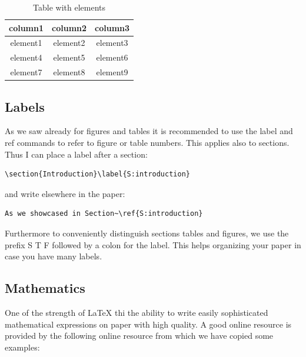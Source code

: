 \begin{table}[htb]
\caption{Table with elements}\label{T:elements}
\bigskip
\begin{center}
\begin{tabular}{ c c c }
 column1  & column2  & column3 \\
\hline
\hline
 element1 & element2 & element3 \\ 
 element4 & element5 & element6 \\  
 element7 & element8 & element9 \\
\hline
\end{tabular}
\end{center}
\end{table}

\subsection{Labels}\label{labels}

As we saw already for figures and tables it is recommended to use the
label and ref commands to refer to figure or table numbers. This applies
also to sections. Thus I can place a label after a section:

\begin{verbatim}
\section{Introduction}\label{S:introduction}
\end{verbatim}

and write elsewhere in the paper:

\begin{verbatim}
As we showcased in Section~\ref{S:introduction}
\end{verbatim}

Furthermore to conveniently distinguish sections tables and figures, we
use the prefix S T F followed by a colon for the label. This helps
organizing your paper in case you have many labels.

\subsection{Mathematics}\label{math}

One of the strength of LaTeX thi the ability to write easily
sophisticated mathematical expressions on paper with high quality. A
good online resource is provided by the following online resource from
which we have copied some examples:

